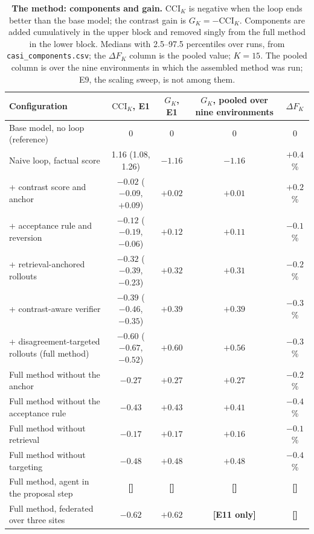 \documentclass[11pt,a4paper]{article}
\newcommand{\tbd}[1]{{\color{red}\textbf{[#1]}}}
\newcommand{\CCI}{\mathrm{CCI}}
\begin{document}
\FloatBarrier


\clearpage
\begin{table}[!htbp]\centering\footnotesize
\caption{\textbf{The method: components and gain.} $\CCI_K$ is negative when the loop ends better than the base model; the contrast gain is $G_K=-\CCI_K$. Components are added cumulatively in the upper block and removed singly from the full method in the lower block. Medians with 2.5--97.5 percentiles over runs, from \texttt{casi\_components.csv}; the $\Delta F_K$ column is the pooled value; $K=15$. The pooled column is over the nine environments in which the assembled method was run; E9, the scaling sweep, is not among them.}\label{tab:method}
\begin{tabularx}{\textwidth}{@{}p{5.2cm} C C C C@{}}\toprule
Configuration & $\CCI_K$, E1 & $G_K$, E1 & $G_K$, pooled over nine environments & $\Delta F_K$\\\midrule
Base model, no loop (reference) & 0 & 0 & 0 & 0\\
Naive loop, factual score & 1.16 (1.08, 1.26) & $-1.16$ & $-1.16$ & $+0.4$\%\\
\quad + contrast score and anchor & $-0.02$ ($-0.09$, $+0.09$) & $+0.02$ & $+0.01$ & $+0.2$\%\\
\quad + acceptance rule and reversion & $-0.12$ ($-0.19$, $-0.06$) & $+0.12$ & $+0.11$ & $-0.1$\%\\
\quad + retrieval-anchored rollouts & $-0.32$ ($-0.39$, $-0.23$) & $+0.32$ & $+0.31$ & $-0.2$\%\\
\quad + contrast-aware verifier & $-0.39$ ($-0.46$, $-0.35$) & $+0.39$ & $+0.39$ & $-0.3$\%\\
\quad + disagreement-targeted rollouts (full method) & $-0.60$ ($-0.67$, $-0.52$) & $+0.60$ & $+0.56$ & $-0.3$\%\\\midrule
Full method without the anchor & $-0.27$ & $+0.27$ & $+0.27$ & $-0.2$\%\\
Full method without the acceptance rule & $-0.43$ & $+0.43$ & $+0.41$ & $-0.4$\%\\
Full method without retrieval & $-0.17$ & $+0.17$ & $+0.16$ & $-0.1$\%\\
Full method without targeting & $-0.48$ & $+0.48$ & $+0.48$ & $-0.4$\%\\\midrule
Full method, agent in the proposal step & \tbd{} & \tbd{} & \tbd{} & \tbd{}\\
Full method, federated over three sites & $-0.62$ & $+0.62$ & \tbd{E11 only} & \tbd{}\\
\bottomrule\end{tabularx}
\end{table}
\end{document}
